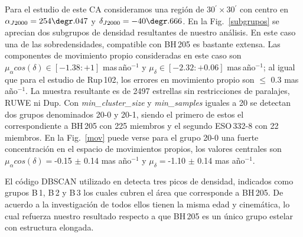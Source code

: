 \documentclass[baaa]{baaa}
\begin{document}
Para el estudio de este CA consideramos una regi\'on de 30$^\prime\times$30$^\prime$ con centro en $\alpha_{J2000}=254\degr.047$ y $\delta_{J2000}=-40\degr.666$. En la Fig.~\ref{subgrupos} se aprecian dos subgrupos de densidad resultantes de nuestro an\'alisis. En este caso una de las sobredensidades, compatible con BH\,205 es bastante extensa. Las componentes de movimiento propio consideradas en este caso son $\mu_{\alpha}cos(\delta)\in[-1.38:+1]$ mas\,a\~no$^{-1}$ y $\mu_{\delta}\in[-2.32:+0.06]$ mas\,a\~no$^{-1}$; al igual que para el estudio de Rup\,102, los errores en movimiento propio son $\leq$ 0.3 mas\,a\~no$^{-1}$. La muestra resultante es de 2497 estrellas sin restricciones de paralajes, RUWE ni Dup. %
Con {\em min\_cluster\_size} y {\em min\_samples} iguales a 20 se detectan dos grupos denominados 20-0 y 20-1, siendo el primero de estos el correspondiente a BH\,205 con 225 miembros y el segundo ESO\,332-8 con 22 miembros.
En la Fig.~\ref{mov} puede verse para el grupo 20-0 una fuerte concentraci\'on en el espacio de movimientos propios, los valores centrales son $\mu_{\alpha} cos(\delta)=$-0.15 $\pm$ 0.14 mas a\~no$^{-1}$ y $\mu_{\delta}=$-1.10 $\pm$ 0.14 mas a\~no$^{-1}$. %

El c\'odigo {\sc DBSCAN} utilizado en \citet{miotrumpler24} detecta tres picos de densidad, indicados como grupos B\,1, B\,2 y B\,3 los cuales cubren el \'area que corresponde a BH\,205. De acuerdo a la investigaci\'on de \citet{miotrumpler24} todos ellos tienen la misma edad y cinem\'atica, lo cual refuerza nuestro resultado respecto a que BH\,205 es un \'unico grupo estelar con estructura elongada. 
\end{document}
